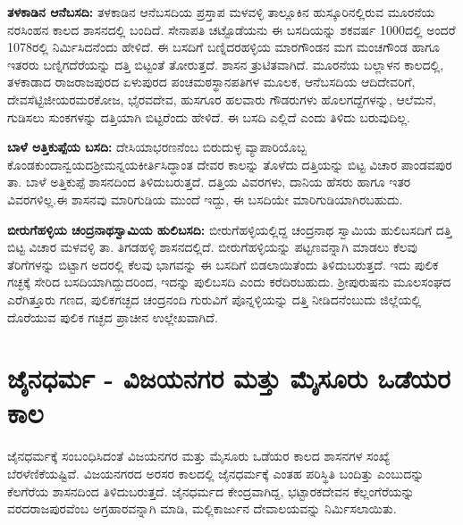 \textbf{ತಳಕಾಡಿನ ಆನೆಬಸದಿ:} ತಳಕಾಡಿನ ಆನೆಬಸದಿಯ ಪ್ರಸ್ತಾಪ ಮಳವಳ್ಳಿ ತಾಲ್ಲೂಕಿನ ಹುಸ್ಕೂರಿನಲ್ಲಿರುವ ಮೂರನೆಯ ನರಸಿಂಹನ ಕಾಲದ ಶಾಸನದಲ್ಲಿ ಬಂದಿದೆ. ಸೇನಾಪತಿ ಚಟ್ಟೊಡೆಯನು ಈ ಬಸದಿಯನ್ನು ಶಕವರ್ಷ 1000ದಲ್ಲಿ ಅಂದರೆ 1078ರಲ್ಲಿ ನಿರ್ಮಿಸಿದನೆಂದು ಹೇಳಿದೆ. ಈ ಬಸದಿಗೆ ಬಣ್ನಿದರಹಳ್ಳಿಯ ಮಾರಗೌಂಡನ ಮಗ ಮಂಚಗೌಂಡ ಹಾಗೂ ಇತರರು ಬಣ್ನಿಗದೆರೆಯನ್ನು ದತ್ತಿ ಬಿಟ್ಟಂತೆ ತೋರುತ್ತದೆ. ಶಾಸನ ತ್ರುಟಿತವಾಗಿದೆ. ಮೂರನೆಯ ಬಲ್ಲಾಳನ ಕಾಲದಲ್ಲಿ, ತಳಕಾಡಾದ ರಾಜರಾಜಪುರದ ಏಳುಪುರದ ಪಂಚಮಠಸ್ಥಾನಪತಿಗಳ ಮೂಲಕ, ಆನೆಬಸದಿಯ ಆದಿದೇವರಿಗೆ, ದೇವಸೆಟ್ಟಿಜೀಯರ\break ಮರಕೋಜ, ಭೈರವದೇವ, ಹುಸಗೂರ ಹಲವಾರು ಗೌಡರುಗಳು ಹೊಲಗದ್ದೆಗಳನ್ನು, ಆಲೆಮನೆ, ಗುಡಿಸಲು ಸುಂಕಗಳನ್ನು ದತ್ತಿಯಾಗಿ ಬಿಟ್ಟರೆಂದು ಹೇಳಿದೆ. ಈ ಬಸದಿ ಎಲ್ಲಿದೆ ಎಂದು ತಿಳಿದು ಬರುವುದಿಲ್ಲ.

\textbf{ಬಾಳೆ ಅತ್ತಿಕುಪ್ಪೆಯ ಬಸದಿ:} ದೇಸಿಯಾಭರಣನೆಂಬ ಬಿರುದುಳ್ಳ ವ್ಯಾಪಾರಿಯೊಬ್ಬ ಕೊಂಡಕುಂದಾನ್ವಯದ\break ಶ‍್ರೀಮನ್ನಯಕೀರ್ತಿಸಿದ್ಧಾಂತ ದೇವರ ಕಾಲನ್ನು ತೊಳೆದು ದತ್ತಿಯನ್ನು ಬಿಟ್ಟ ವಿಚಾರ ಪಾಂಡವಪುರ ತಾ. ಬಾಳೆ ಅತ್ತಿಕುಪ್ಪೆ ಶಾಸನದಿಂದ ತಿಳಿದುಬರುತ್ತದೆ. ದತ್ತಿಯ ವಿವರಗಳು, ದಾನಿಯ ಹೆಸರು ಹಾಗೂ ಇತರ ವಿವರಗಳಿಲ್ಲ.ಈ ಶಾಸನವು ಮಾರಿಗುಡಿಯ ಮುಂದೆ ಇದ್ದು, ಈ ಬಸದಿಯೇ ಮಾರಿಗುಡಿಯಾಗಿರಬಹುದು.

\textbf{ಬೀರುಗೆಹಳ್ಳಿಯ ಚಂದ್ರನಾಥಸ್ವಾಮಿಯ ಹುಲಿಬಸದಿ:} ಬೀರುಗೆಹಳ್ಳಿಯಲ್ಲಿದ್ದ ಚಂದ್ರನಾಥ ಸ್ವಾಮಿಯ ಹುಲಿಬಸದಿಗೆ ದತ್ತಿ ಬಿಟ್ಟ ವಿಚಾರ ಮಳವಳ್ಳಿ ತಾ. ತಿಗಡಹಳ್ಳಿ ಶಾಸನದಲ್ಲಿದೆ. ಬೀರುಗೆಹಳ್ಳಿಯನ್ನು ಪಟ್ಟಣವನ್ನಾಗಿ ಮಾಡಲು ಕೆಲವು ತೆರಿಗೆಗಳನ್ನು ಬಿಟ್ಟಾಗ ಅದರಲ್ಲಿ ಕೆಲವು ಭಾಗವನ್ನು ಈ ಬಸದಿಗೆ ಬಿಡಲಾಯಿತೆಂದು ತಿಳಿದುಬರುತ್ತದೆ. ಇದು ಪುಲಿಕ ಗಚ್ಛಕ್ಕೆ ಸೇರಿದ ಬಸದಿಯಾಗಿದ್ದುದರಿಂದ, ಇದನ್ನು ಪುಲಿಬಸದಿ ಎಂದು ಕರೆದಿರಬಹುದು. ಶ‍್ರೀಪುರುಷನು ಮೂಲಸಂಘದ ಎರೆಗಿತ್ತೂರು ಗಣದ, ಪುಲಿಕಗಚ್ಛದ ಚಂದ್ರನಂದಿ ಗುರುವಿಗೆ ಪೊನ್ನಳ್ಳಿಯನ್ನು ದತ್ತಿ ನೀಡಿದನೆಂಬುದು ಜಿಲ್ಲೆಯಲ್ಲಿ ದೊರೆಯುವ ಪುಲಿಕ ಗಚ್ಛದ ಪ್ರಾಚೀನ ಉಲ್ಲೇಖವಾಗಿದೆ. 


\section*{ಜೈನಧರ್ಮ - ವಿಜಯನಗರ ಮತ್ತು ಮೈಸೂರು ಒಡೆಯರ ಕಾಲ}

ಜೈನಧರ್ಮಕ್ಕೆ ಸಂಬಂಧಿಸಿದಂತೆ ವಿಜಯನಗರ ಮತ್ತು ಮೈಸೂರು ಒಡೆಯರ ಕಾಲದ ಶಾಸನಗಳ ಸಂಖ್ಯೆ ಬೆರಳೆಣಿಕೆಯಷ್ಟಿವೆ. ವಿಜಯನಗರದ ಅರಸರ ಕಾಲದಲ್ಲಿ ಜೈನಧರ್ಮಕ್ಕೆ ಎಂತಹ ಪರಿಸ್ಥಿತಿ ಬಂದಿತ್ತು ಎಂಬುದನ್ನು ಕೆಲಗೆರೆಯ ಶಾಸನದಿಂದ ತಿಳಿದುಬರುತ್ತದೆ. ಜೈನಧರ್ಮದ ಕೇಂದ್ರವಾಗಿದ್ದ, ಭಟ್ಟಾರಕದೇವನ ಕೆಲ್ಲಂಗೆರೆಯನ್ನು ವರದರಾಜಪುರವೆಂಬ ಅಗ್ರಹಾರವನ್ನಾಗಿ ಮಾಡಿ, ಮಲ್ಲಿಕಾರ್ಜುನ ದೇವಾಲಯವನ್ನು ನಿರ್ಮಿಸಲಾಯಿತು.

